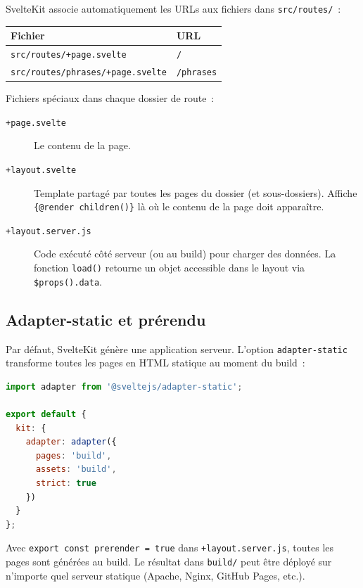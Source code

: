 SvelteKit associe automatiquement les URLs aux fichiers dans \texttt{src/routes/}~:

\begin{center}
\begin{tabular}{ll}
  \toprule
  \textbf{Fichier} & \textbf{URL} \\
  \midrule
  \texttt{src/routes/+page.svelte} & \texttt{/} \\
  \texttt{src/routes/phrases/+page.svelte} & \texttt{/phrases} \\
  \bottomrule
\end{tabular}
\end{center}

Fichiers spéciaux dans chaque dossier de route~:
\begin{description}
  \item[\texttt{+page.svelte}] Le contenu de la page.
  \item[\texttt{+layout.svelte}] Template partagé par toutes les pages du dossier (et sous-dossiers). Affiche \texttt{\{@render children()\}} là où le contenu de la page doit apparaître.
  \item[\texttt{+layout.server.js}] Code exécuté côté serveur (ou au build) pour charger des données. La fonction \texttt{load()} retourne un objet accessible dans le layout via \texttt{\$props().data}.
\end{description}

\subsection{Adapter-static et prérendu}

Par défaut, SvelteKit génère une application serveur. L'option \texttt{adapter-static} transforme toutes les pages en HTML statique au moment du build~:

\begin{lstlisting}[language=javascript, title=svelte.config.js]
import adapter from '@sveltejs/adapter-static';

export default {
  kit: {
    adapter: adapter({
      pages: 'build',
      assets: 'build',
      strict: true
    })
  }
};
\end{lstlisting}

Avec \texttt{export const prerender = true} dans \texttt{+layout.server.js}, toutes les pages sont générées au build. Le résultat dans \texttt{build/} peut être déployé sur n'importe quel serveur statique (Apache, Nginx, GitHub Pages, etc.).

